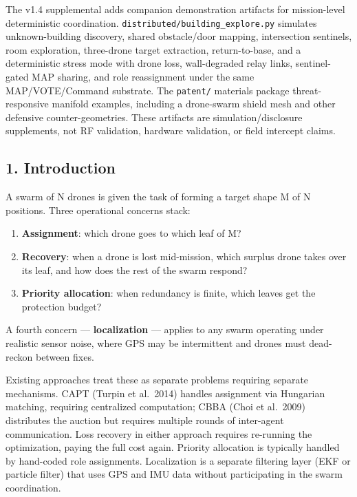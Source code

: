 The v1.4 supplemental adds companion demonstration artifacts for
mission-level deterministic coordination.
\texttt{distributed/building\_explore.py} simulates unknown-building
discovery, shared obstacle/door mapping, intersection sentinels, room
exploration, three-drone target extraction, return-to-base, and a
deterministic stress mode with drone loss, wall-degraded relay links,
sentinel-gated MAP sharing, and role reassignment under the same
MAP/VOTE/Command substrate. The \texttt{patent/} materials package
threat-responsive manifold examples, including a drone-swarm shield mesh
and other defensive counter-geometries. These artifacts are
simulation/disclosure supplements, not RF validation, hardware
validation, or field intercept claims.

\subsection{1. Introduction}\label{introduction}

A swarm of N drones is given the task of forming a target shape M of N
positions. Three operational concerns stack:

\begin{enumerate}
\def\labelenumi{\arabic{enumi}.}
\tightlist
\item
  \textbf{Assignment}: which drone goes to which leaf of M?
\item
  \textbf{Recovery}: when a drone is lost mid-mission, which surplus
  drone takes over its leaf, and how does the rest of the swarm respond?
\item
  \textbf{Priority allocation}: when redundancy is finite, which leaves
  get the protection budget?
\end{enumerate}

A fourth concern --- \textbf{localization} --- applies to any swarm
operating under realistic sensor noise, where GPS may be intermittent
and drones must dead-reckon between fixes.

Existing approaches treat these as separate problems requiring separate
mechanisms. CAPT (Turpin et al.~2014) handles assignment via Hungarian
matching, requiring centralized computation; CBBA (Choi et al.~2009)
distributes the auction but requires multiple rounds of inter-agent
communication. Loss recovery in either approach requires re-running the
optimization, paying the full cost again. Priority allocation is
typically handled by hand-coded role assignments. Localization is a
separate filtering layer (EKF or particle filter) that uses GPS and IMU
data without participating in the swarm coordination.

